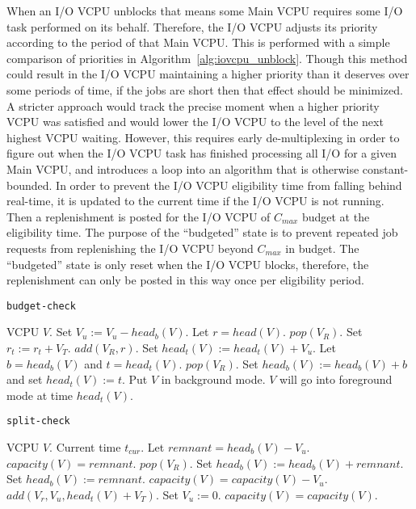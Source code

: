 \documentclass[twocolumn,10pt]{article}
\begin{document}
When an I/O VCPU unblocks that means some Main VCPU requires some I/O
task performed on its behalf.  Therefore, the I/O VCPU adjusts its
priority according to the period of that Main VCPU.  This is performed
with a simple comparison of priorities in
Algorithm~\ref{alg:iovcpu_unblock}.  Though this method could result
in the I/O VCPU maintaining a higher priority than it deserves over
some periods of time, if the jobs are short then that effect should be
minimized.  A stricter approach would track the precise moment when a
higher priority VCPU was satisfied and would lower the I/O VCPU to the
level of the next highest VCPU waiting.  However, this requires early
de-multiplexing in order to figure out when the I/O VCPU task has
finished processing all I/O for a given Main VCPU, and introduces a
loop into an algorithm that is otherwise constant-bounded.  In order
to prevent the I/O VCPU eligibility time from falling behind
real-time, it is updated to the current time if the I/O VCPU is not
running.  Then a replenishment is posted for the I/O VCPU of $C_{max}$
budget at the eligibility time.  The purpose of the ``budgeted'' state
is to prevent repeated job requests from replenishing the I/O VCPU
beyond $C_{max}$ in budget.  The ``budgeted'' state is only reset when
the I/O VCPU blocks, therefore, the replenishment can only be posted
in this way once per eligibility period.

\begin{algorithm*}
  \caption{\tt budget-check}
  \begin{algorithmic}[1]
    \REQUIRE VCPU $V$.
    \STATE Set $V_u:=V_u-head_b(V)$.
    \STATE Let $r=head(V)$.
    \STATE $pop(V_R)$.
    \STATE Set $r_t:=r_t+V_T$.
    \STATE $add(V_R,r)$.
    \ENDWHILE
    \STATE Set $head_t(V) := head_t(V) + V_u$.
    \STATE Let $b=head_b(V)$ and $t=head_t(V)$.
    \STATE $pop(V_R)$.
    \STATE Set $head_b(V):=head_b(V)+b$ and set $head_t(V):=t$.
    \ENDIF
    \ENDIF
    \STATE Put $V$ in background mode.
    \STATE $V$ will go into foreground mode at time $head_t(V)$.
    \ENDIF
    \ENDIF
    \ENDIF
  \end{algorithmic}
\end{algorithm*}

\begin{algorithm*}
  \caption{\tt split-check}
  \begin{algorithmic}[1]
    \REQUIRE VCPU $V$.
    \REQUIRE Current time $t_{cur}$.
    \STATE Let $remnant=head_b(V)-V_u$.
    \ENSURE $capacity(V)=remnant$.
    \STATE $pop(V_R)$.
    \STATE Set $head_b(V):=head_b(V)+remnant$.
    \ELSE
    \STATE Set $head_b(V):=remnant$.
    \ENSURE $capacity(V)=capacity(V)-V_u$.
    \ENDIF
    \STATE $add(V_r, V_u, head_t(V)+V_T)$.
    \STATE Set $V_u:=0$.
    \ENSURE $capacity(V)=capacity(V)$.
    \ENDIF
  \end{algorithmic}
\end{algorithm*}
\end{document}
